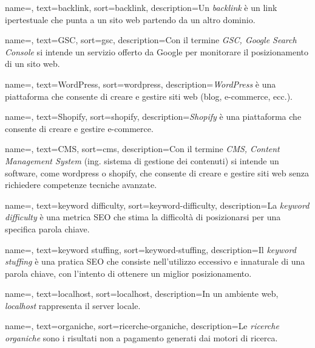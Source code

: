  {
    name=,
    text=backlink,
    sort=backlink,
    description={Un \emph{backlink} è un link ipertestuale che punta a un sito web partendo da un altro dominio.}
}

 {
    name=,
    text=GSC,
    sort=gsc,
    description={Con il termine \emph{GSC, Google Search Console} si intende un servizio offerto da Google per monitorare il posizionamento di un sito web.}
}

 {
    name=,
    text=WordPress,
    sort=wordpress,
    description={\emph{WordPress} è una piattaforma che consente di creare e gestire siti web (blog, e-commerce, ecc.).}
}

 {
    name=,
    text=Shopify,
    sort=shopify,
    description={\emph{Shopify} è una piattaforma che consente di creare e gestire e-commerce.}
}

 {
    name=,
    text=CMS,
    sort=cms,
    description={Con il termine \emph{CMS, Content Management System} (ing. sistema di gestione dei contenuti) si intende un software, come \gls{wordpress} o \gls{shopify}, che consente di creare e gestire siti web senza richiedere competenze tecniche avanzate.}
}

 {
    name=,
    text=keyword difficulty,
    sort=keyword-difficulty,
    description={La \emph{keyword difficulty} è una metrica SEO che stima la difficoltà di posizionarsi per una specifica parola chiave.}
}

 {
    name=,
    text=keyword stuffing,
    sort=keyword-stuffing,
    description={Il \emph{keyword stuffing} è una pratica SEO che consiste nell'utilizzo eccessivo e innaturale di una parola chiave, con l'intento di ottenere un miglior posizionamento.}
}

 {
    name=,
    text=localhost,
    sort=localhost,
    description={In un ambiente web, \emph{localhost} rappresenta il server locale.}
}

 {
    name=,
    text=organiche,
    sort=ricerche-organiche,
    description={Le \emph{ricerche organiche} sono i risultati non a pagamento generati dai motori di ricerca.}
}

